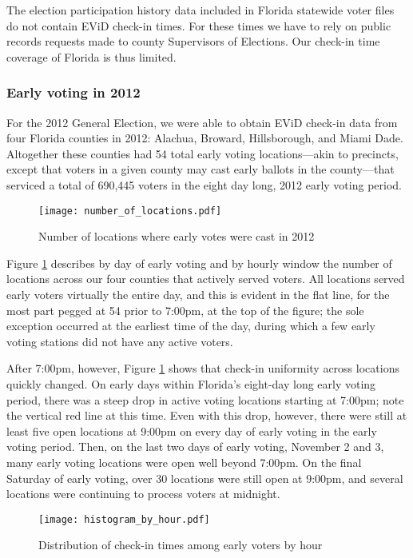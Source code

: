 \documentclass[12pt,titlepage]{article}
\begin{document}
The election participation history data included in Florida statewide
voter files do not contain EViD check-in times.  For these times we
have to rely on public records requests made to county Supervisors of
Elections.  Our check-in time coverage of Florida is thus limited.

\subsubsection*{Early voting in 2012}

For the 2012 General Election, we were able to obtain EViD check-in
data from four Florida counties in 2012: Alachua, Broward,
Hillsborough, and Miami Dade.  Altogether these counties had 54 total
early voting locations---akin to precincts, except that voters in a
given county may cast early ballots in the county---that serviced a
total of 690,445 voters in the eight day long, 2012 early voting
period.

\begin{figure}[!ht]
\caption{Number of locations where early votes were cast in 2012}
  \label{fig:nrlocs2012}
  \centering
    \centering\texttt{[image: number\_of\_locations.pdf]}
\end{figure}

Figure \ref{fig:nrlocs2012} describes by day of early voting and by
hourly window the number of locations across our four counties that
actively served voters.  All locations served early voters virtually
the entire day, and this is evident in the flat line, for the most
part pegged at 54 prior to 7:00pm, at the top of the figure; the sole
exception occurred at the earliest time of the day, during which a few
early voting stations did not have any active voters.

After 7:00pm, however, Figure \ref{fig:nrlocs2012} shows that check-in
uniformity across locations quickly changed.  On early days within
Florida's eight-day long early voting period, there was a steep drop
in active voting locations starting at 7:00pm; note the vertical red
line at this time.  Even with this drop, however, there were still at
least five open locations at 9:00pm on every day of early voting in
the early voting period.  Then, on the last two days of early voting,
November 2 and 3, many early voting locations were open well beyond
7:00pm.  On the final Saturday of early voting, over 30 locations were
still open at 9:00pm, and several locations were continuing to process
voters at midnight.

\begin{figure}[!ht]
\caption{Distribution of check-in times among early voters by hour}
  \label{fig:hist2012}
  \centering
    \centering\texttt{[image: histogram\_by\_hour.pdf]}
\end{figure}
\end{document}
